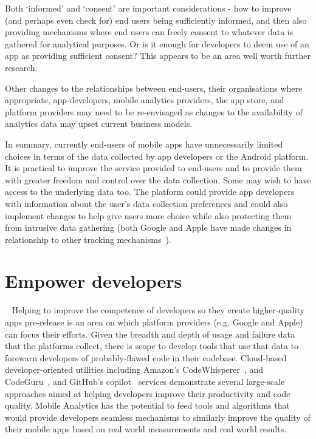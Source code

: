 Both `informed' and `consent' are important considerations - how to improve (and perhaps even check for) end users being sufficiently informed, and then also providing mechanisms where end users can freely consent to whatever data is gathered for analytical purposes. Or is it enough for developers to deem use of an app as providing sufficient consent? This appears to be an area well worth further research. 

Other changes to the relationships between end-users, their organisations where appropriate, app-developers, mobile analytics providers, the app store, and platform providers may need to be re-envisaged as changes to the availability of analytics data may upset current business models.


In summary, currently end-users of mobile apps have unnecessarily limited choices in terms of the data collected by app developers or the Android platform. It is practical to improve the service provided to end-users and to provide them with greater freedom and control over the data collection. Some may wish to have access to the underlying data too. The platform could provide app developers with information about the user's data collection preferences and could also implement changes to help give users more choice while also protecting them from intrusive data gathering (both Google and Apple have made changes in relationship to other tracking mechanisms~). 


\section{Empower developers}~\label{discussion-empower-developers}
Helping to improve the competence of developers so they create higher-quality apps pre-release is an area on which platform providers (e.g. Google and Apple) can focus their efforts.  Given the breadth and depth of usage and failure data that the platforms collect, there is scope to develop tools that use that data to forewarn developers of probably-flawed code in their codebase. Cloud-based developer-oriented utilities including Amazon’s CodeWhisperer~, and CodeGuru~, and GitHub’s copilot~ services demonstrate several large-scale approaches aimed at helping developers improve their productivity and code quality. Mobile Analytics has the potential to feed tools and algorithms that would provide developers seamless mechanisms to similarly improve the quality of their mobile apps based on real world measurements and real world results.

